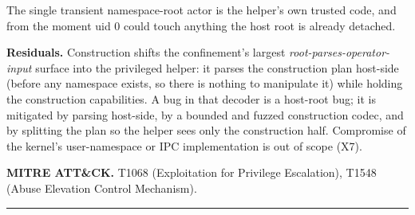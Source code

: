 The single transient namespace-root actor is the helper's own trusted
code, and from the moment uid 0 could touch anything the host root is
already detached.

\textbf{Residuals.} Construction shifts the confinement's largest
\emph{root-parses-operator-input} surface into the privileged helper: it
parses the construction plan host-side (before any namespace exists, so
there is nothing to manipulate it) while holding the construction
capabilities. A bug in that decoder is a host-root bug; it is mitigated
by parsing host-side, by a bounded and fuzzed construction codec, and by
splitting the plan so the helper sees only the construction half.
Compromise of the kernel's user-namespace or IPC implementation is out
of scope (X7).

\textbf{MITRE ATT\&CK.} T1068 (Exploitation for Privilege Escalation),
T1548 (Abuse Elevation Control Mechanism).

\begin{center}\rule{0.5\linewidth}{0.5pt}\end{center}
